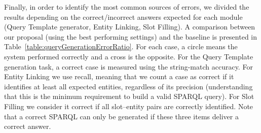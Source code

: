 Finally, in order to identify the most common sources of errors, we divided the results depending 
on the correct/incorrect answers expected for each module (Query Template generator, Entity Linking, 
Slot Filling). A comparison between our proposal (using the best performing settings) and the 
baseline is presented in Table~\ref{table:queryGenerationErrorRatio}. For each case, a circle 
means the system performed correctly and a cross is the opposite. For the Query Template 
generation task, a correct case is measured using the string-match accuracy. For Entity Linking 
we use recall, meaning that we count a case as correct if it identifies at least all expected 
entities, regardless of its precision (understanding that this is the minimum requirement to 
build a valid SPARQL query). For Slot Filling we consider it correct if all slot--entity pairs 
are correctly identified. Note that a correct SPARQL can only be generated if these three items 
deliver a correct answer.

